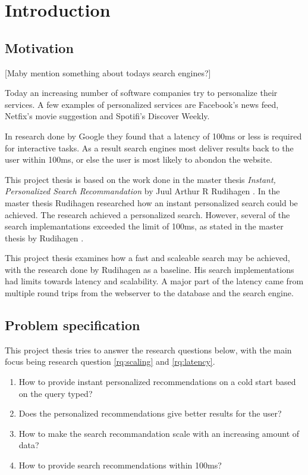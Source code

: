 \chapter{Introduction}
\section{Motivation}
[Maby mention something about todays search engines?]

Today an increasing number of software companies try to personalize their services.
A few examples of personalized services are Facebook's news feed, Netfix's movie suggestion and Spotifi's Discover Weekly.

In research done by Google \cite{google-latency} they found that a latency of 100ms or less is required for interactive tasks.
As a result search engines most deliver results back to the user within 100ms, or else the user is most likely to abondon the website.

This project thesis is based on the work done in the master thesis \textit{Instant, Personalized Search Recommandation} by Juul Arthur R Rudihagen \cite{master-thesis}.
In the master thesis Rudihagen researched how an instant personalized search could be achieved.
The research achieved a personalized search.
However, several of the search implemantations exceeded the limit of 100ms, as stated in the master thesis by Rudihagen \cite[sec 6.6]{master-thesis}.

This project thesis examines how a fast and scaleable search may be achieved, with the research done by Rudihagen as a baseline.
His search implementations had limits towards latency and scalability.
A major part of the latency came from multiple round trips from the webserver to the database and the search engine.

\section{Problem specification}
This project thesis tries to answer the research questions below, with the main focus being research question \ref{rq:scaling} and \ref{rq:latency}.

\begin{enumerate}
  \item How to provide instant personalized recommendations on a cold start based on the query typed?
  \item Does the personalized recommendations give better results for the user?
  \item\label{rq:scaling} How to make the search recommandation scale with an increasing amount of data?
  \item\label{rq:latency} How to provide search recommendations within 100ms?
\end{enumerate}

